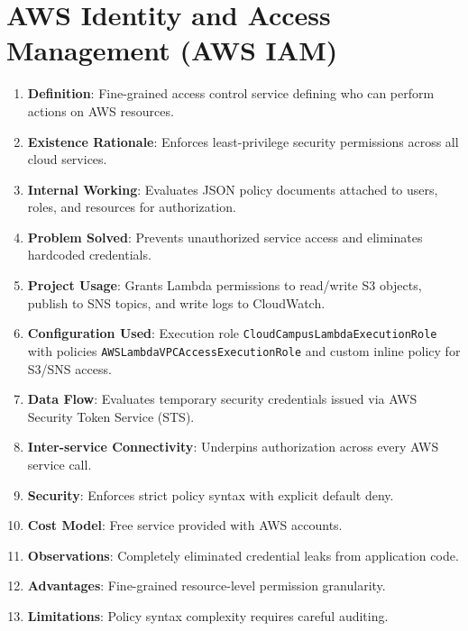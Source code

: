 \section{AWS Identity and Access Management (AWS IAM)}
\begin{enumerate}
    \item \textbf{Definition}: Fine-grained access control service defining who can perform actions on AWS resources.
    \item \textbf{Existence Rationale}: Enforces least-privilege security permissions across all cloud services.
    \item \textbf{Internal Working}: Evaluates JSON policy documents attached to users, roles, and resources for authorization.
    \item \textbf{Problem Solved}: Prevents unauthorized service access and eliminates hardcoded credentials.
    \item \textbf{Project Usage}: Grants Lambda permissions to read/write S3 objects, publish to SNS topics, and write logs to CloudWatch.
    \item \textbf{Configuration Used}: Execution role \texttt{CloudCampusLambdaExecutionRole} with policies \texttt{AWSLambdaVPCAccessExecutionRole} and custom inline policy for S3/SNS access.
    \item \textbf{Data Flow}: Evaluates temporary security credentials issued via AWS Security Token Service (STS).
    \item \textbf{Inter-service Connectivity}: Underpins authorization across every AWS service call.
    \item \textbf{Security}: Enforces strict policy syntax with explicit default deny.
    \item \textbf{Cost Model}: Free service provided with AWS accounts.
    \item \textbf{Observations}: Completely eliminated credential leaks from application code.
    \item \textbf{Advantages}: Fine-grained resource-level permission granularity.
    \item \textbf{Limitations}: Policy syntax complexity requires careful auditing.
\end{enumerate}

